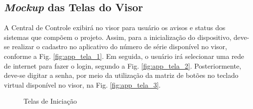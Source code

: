 \begin{apendicesenv}

\chapter{\textit{Mockup} das Telas do Visor}\label{app_telas_display}

A Central de Controle exibirá no visor para usuário os avisos e status dos sistemas que compõem o projeto. Assim, para a inicialização do dispositivo, deve-se realizar o cadastro no aplicativo do número de série disponível no visor, conforme a Fig. \ref{fig:app_tela_1}. Em seguida, o usuário irá selecionar uma rede de internet para fazer o login, segundo a Fig. \ref{fig:app_tela_2}. Posteriormente, deve-se digitar a senha, por meio da utilização da matriz de botões no teclado virtual disponível no visor, na Fig. \ref{fig:app_tela_3}. 

\begin{figure}[H]
    \centering
    \caption{Telas de Iniciação}\label{fig:telas_1_2_3}
\end{figure}


\end{apendicesenv}
